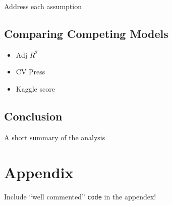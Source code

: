 \documentclass[american,]{article}
\providecommand{\tightlist}{%
  \setlength{\itemsep}{0pt}\setlength{\parskip}{0pt}}
\begin{document}
Address each assumption

\hypertarget{comparing-competing-models-1}{%
\subsection{Comparing Competing
Models}\label{comparing-competing-models-1}}

\begin{itemize}
\tightlist
\item
  Adj \(R^2\)
\item
  CV Press
\item
  Kaggle score
\end{itemize}

\hypertarget{conclusion-1}{%
\subsection{Conclusion}\label{conclusion-1}}

A short summary of the analysis

\hypertarget{appendix}{%
\section{Appendix}\label{appendix}}

Include ``well commented'' \texttt{code} in the appendex!

\renewcommand\refname{References}

\end{document}
